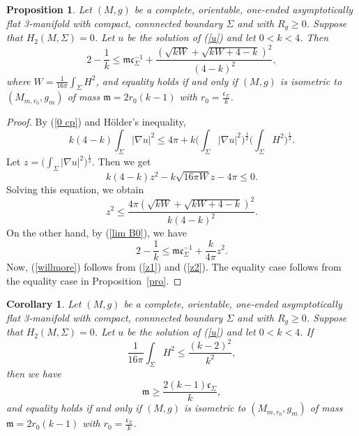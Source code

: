 \documentclass[12pt]{article}
\theoremstyle{definition}
\theoremstyle{plain}
\newtheorem{proposition}{Proposition}[section]
\newtheorem{corollary}{Corollary}[section]
\numberwithin{equation}{section}
\begin{document}
\begin{proposition}\label{cor1}
Let $ (M,g) $ be a complete, orientable, one-ended asymptotically flat 3-manifold with compact, connnected boundary $ \Sigma $ and with $ R_{g}\geq 0 $. Suppose that $ H_{2}(M,\Sigma)=0 $. Let $ u $ be the solution of (\ref{u}) and let $ 0<k<4 $. Then
	\begin{equation}\label{willmore}
	2-\frac{1}{k}\leq \mathfrak{m}\mathfrak{c}_{\Sigma}^{-1}+\frac{(\sqrt{kW}+\sqrt{kW+4-k})^{2}}{(4-k)^{2}},
	\end{equation}
	where $ W=\frac{1}{16\pi}\int_{\Sigma}H^{2} $, and equality holds if and only if $ (M,g) $ is isometric to $ (M_{m,r_{0}},g_{m}) $ of mass $ \mathfrak{m}=2r_{0}(k-1) $ with $ r_{0}=\frac{\mathfrak{c}_{\Sigma}}{k} $.
\end{proposition}
\begin{proof}
	By (\ref{0 cp}) and H\"older's inequality, 
	$$
	k(4-k)\int_{\Sigma}|\nabla u|^{2}\leq 4\pi+k\Big(\int_{\Sigma}|\nabla u|^{2}\Big)^{\frac{1}{2}}\Big(\int_{\Sigma}H^{2}\Big)^{\frac{1}{2}}.
	$$
	Let $ z=\Big(\int_{\Sigma}|\nabla u|^{2}\Big)^{\frac{1}{2}} $. Then we get
	$$
	k(4-k)z^{2}-k\sqrt{16\pi W}z-4\pi\leq 0.
	$$
	Solving this equation, we obtain
\begin{equation}\label{z1}
	z^{2}\leq \frac{4\pi(\sqrt{kW}+\sqrt{kW+4-k})^{2}}{k(4-k)^{2}}.
\end{equation}
	On the other hand, by (\ref{lim B0}), we have 
\begin{equation}\label{z2}
	2-\frac{1}{k}\leq \mathfrak{m}\mathfrak{c}_{\Sigma}^{-1}+\frac{k}{4\pi}z^{2}.
\end{equation}
Now, (\ref{willmore}) follows from (\ref{z1}) and (\ref{z2}). The equality case follows from the equality case in Proposition~\ref{pro}.
\end{proof}

\begin{corollary}
Let $ (M,g) $ be a complete, orientable, one-ended asymptotically flat 3-manifold with compact, connnected boundary $ \Sigma $ and with $ R_{g}\geq 0 $. Suppose that $ H_{2}(M,\Sigma)=0 $. Let $ u $ be the solution of (\ref{u}) and let $ 0<k<4 $. If 
$$
\frac{1}{16\pi}\int_{\Sigma}H^{2} \leq \frac{(k-2)^{2}}{k^{2}},
$$
then we have 
$$
\mathfrak{m}\geq \frac{2(k-1)\mathfrak{c}_{\Sigma}}{k},
$$
and equality holds if and only if $ (M,g) $ is isometric to $ (M_{m,r_{0}},g_{m}) $ of mass $ \mathfrak{m}=2r_{0}(k-1) $ with $ r_{0}=\frac{\mathfrak{c}_{\Sigma}}{k} $.
\end{corollary}
\end{document}
